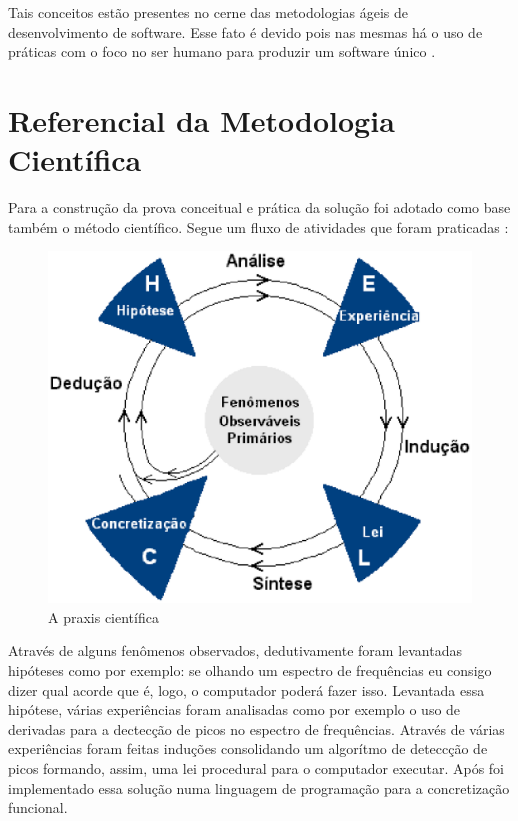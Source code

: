 Tais conceitos estão presentes no cerne das metodologias ágeis de desenvolvimento de software. Esse fato é devido pois nas mesmas há o uso de práticas com o foco no ser humano para produzir um software único \cite{agile}.    

\section{Referencial da Metodologia Científica}
\label{sec:referencialmetodocientifico}

Para a construção da prova conceitual e prática da solução foi adotado como base também o método científico. Segue um fluxo de atividades que foram praticadas \cite{metodo}: 

\begin{figure}[h]
	\centering
		\includegraphics[keepaspectratio=true,scale=0.7]{figuras/metodologia.eps}
	\caption{A praxis científica}
\end{figure}      

Através de alguns fenômenos observados, dedutivamente foram levantadas hipóteses como por exemplo: se olhando um espectro de frequências eu consigo dizer qual acorde que é, logo, o computador poderá fazer isso. Levantada essa hipótese, várias experiências foram analisadas como por exemplo o uso de derivadas para a dectecção de picos no espectro de frequências. Através de várias experiências foram feitas induções consolidando um algorítmo de deteccção de picos formando, assim, uma lei procedural para o computador executar. Após foi implementado essa solução numa linguagem de programação para a concretização funcional.

